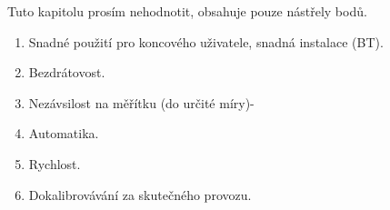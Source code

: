 Tuto kapitolu prosím nehodnotit, obsahuje pouze nástřely bodů.

\begin{enumerate}
	\item Snadné použití pro koncového uživatele, snadná instalace (BT).
	\item Bezdrátovost.
	\item Nezávsilost na měřítku (do určité míry)-
	\item Automatika.
	\item Rychlost.
	\item Dokalibrovávání za skutečného provozu.
\end{enumerate}
